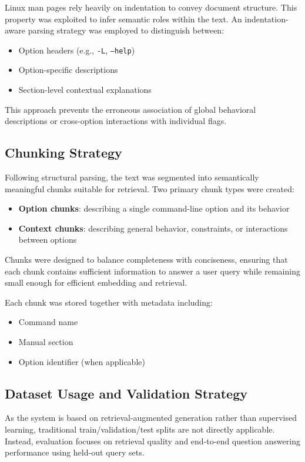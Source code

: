 \documentclass[conference]{IEEEtran}
\begin{document}
Linux man pages rely heavily on indentation to convey document structure. This property was exploited to infer semantic roles within the text. An indentation-aware parsing strategy was employed to distinguish between:
\begin{itemize}
    \item Option headers (e.g., \texttt{-L}, \texttt{--help})
    \item Option-specific descriptions
    \item Section-level contextual explanations
\end{itemize}

This approach prevents the erroneous association of global behavioral descriptions or cross-option interactions with individual flags.

\subsection{Chunking Strategy}

Following structural parsing, the text was segmented into semantically meaningful chunks suitable for retrieval. Two primary chunk types were created:
\begin{itemize}
    \item \textbf{Option chunks}: describing a single command-line option and its behavior
    \item \textbf{Context chunks}: describing general behavior, constraints, or interactions between options
\end{itemize}

Chunks were designed to balance completeness with conciseness, ensuring that each chunk contains sufficient information to answer a user query while remaining small enough for efficient embedding and retrieval.

Each chunk was stored together with metadata including:
\begin{itemize}
    \item Command name
    \item Manual section
    \item Option identifier (when applicable)
\end{itemize}

\subsection{Dataset Usage and Validation Strategy}

As the system is based on retrieval-augmented generation rather than supervised learning, traditional train/validation/test splits are not directly applicable. Instead, evaluation focuses on retrieval quality and end-to-end question answering performance using held-out query sets.
\end{document}
